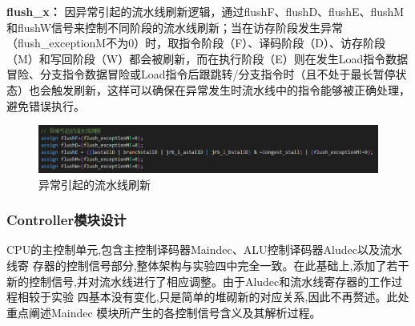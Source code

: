 \textbf{flush\_x：}
因异常引起的流水线刷新逻辑，通过flushF、flushD、flushE、flushM和flushW信号来控制不同阶段的流水线刷新；当在访存阶段发生异常（flush\_exceptionM不为0）时，取指令阶段（F）、译码阶段（D）、访存阶段（M）和写回阶段（W）都会被刷新，而在执行阶段（E）则在发生Load指令数据冒险、分支指令数据冒险或Load指令后跟跳转/分支指令时（且不处于最长暂停状态）也会触发刷新，这样可以确保在异常发生时流水线中的指令能够被正确处理，避免错误执行。
\begin{figure}[h]
\centering
\includegraphics[width=1\linewidth]{image/hazard8.png}
\caption{异常引起的流水线刷新}
\label{fig:enter-label}
\end{figure}

\subsubsection{Controller模块设计}

CPU的主控制单元,包含主控制译码器Maindec、ALU控制译码器Aludec以及流水线寄 存器的控制信号部分,整体架构与实验四中完全一致。在此基础上,添加了若干新的控制信号,并对流水线进行了相应调整。由于Aludec和流水线寄存器的工作过程相较于实验 四基本没有变化,只是简单的堆砌新的对应关系,因此不再赘述。此处重点阐述Maindec 模块所产生的各控制信号含义及其解析过程。 


